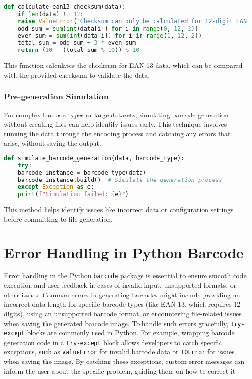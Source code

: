 \begin{lstlisting}[language=Python]
	def calculate_ean13_checksum(data):
	if len(data) != 12:
	raise ValueError("Checksum can only be calculated for 12-digit EAN-13 data.")
	odd_sum = sum(int(data[i]) for i in range(0, 12, 2))
	even_sum = sum(int(data[i]) for i in range(1, 12, 2))
	total_sum = odd_sum + 3 * even_sum
	return (10 - (total_sum % 10)) % 10
\end{lstlisting}

\noindent This function calculates the checksum for EAN-13 data, which can be compared with the provided checksum to validate the data.



\subsubsection{Pre-generation Simulation}
For complex barcode types or large datasets, simulating barcode generation without creating files can help identify issues early. This technique involves running the data through the encoding process and catching any errors that arise, without saving the output.

\begin{lstlisting}[language=Python]
	def simulate_barcode_generation(data, barcode_type):
	try:
	barcode_instance = barcode_type(data)
	barcode_instance.build()  # Simulate the generation process
	except Exception as e:
	print(f"Simulation failed: {e}")
\end{lstlisting}

\noindent This method helps identify issues like incorrect data or configuration settings before committing to file generation.

\section{Error Handling in Python Barcode}

Error handling in the Python \texttt{barcode} package is essential to ensure smooth code execution and user feedback in cases of invalid input, unsupported formats, or other issues. Common errors in generating barcodes might include providing an incorrect data length for specific barcode types (like EAN-13, which requires 12 digits), using an unsupported barcode format, or encountering file-related issues when saving the generated barcode image. To handle such errors gracefully, \texttt{try-except} blocks are commonly used in Python. For example, wrapping barcode generation code in a \texttt{try-except} block allows developers to catch specific exceptions, such as \texttt{ValueError} for invalid barcode data or \texttt{IOError} for issues when saving the image. By catching these exceptions, custom error messages can inform the user about the specific problem, guiding them on how to correct it.

